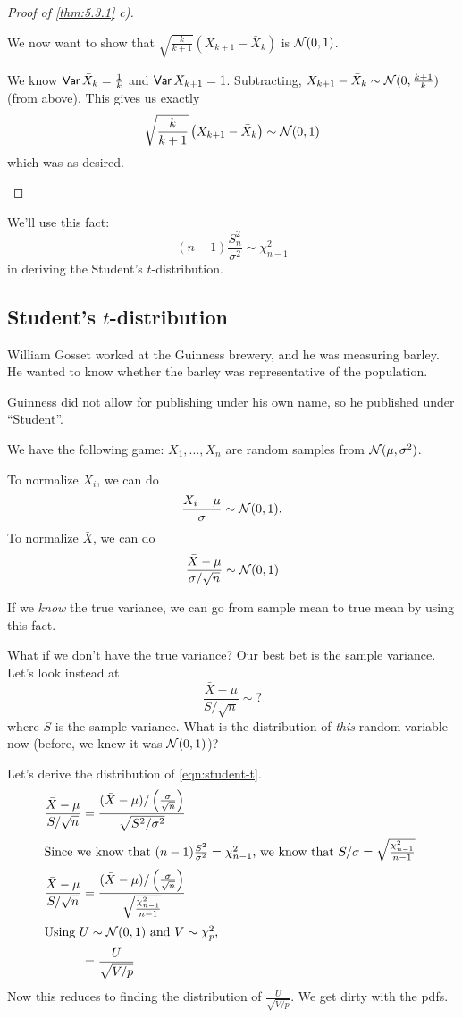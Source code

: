 \begin{proof}[Proof of \cref{thm:5.3.1} c)]
\begin{description}
            We now want to show that $\sqrt{\frac{k}{k+1}}(X_{k+1}-\bar{X}_k)$ is $\mathcal N(0, 1)$.

            We know $\operatorname{\mathsf{Var}} \bar{X}_k = \frac{1}{k}$ and $\operatorname{\mathsf{Var}} X_{k+1} = 1$. Subtracting, $X_{k+1} - \bar{X}_k \sim \mathcal N(0, \frac{k+1}{k})$ (from above). This gives us exactly
            \[\sqrt{\frac{k}{k+1}}\left( X_{k+1} - \bar{X}_k \right)\sim \mathcal N(0, 1)\]
            which was as desired.
    \end{description}
\end{proof}

We'll use this fact:
\[(n-1)\frac{S_n^2}{\sigma^2}\sim \chi^2_{n-1}\]
in deriving the Student's $t$-distribution.

\subsection{Student's \texorpdfstring{$t$}{t}-distribution}

\begin{remark*}
    William Gosset worked at the Guinness brewery, and he was measuring barley. He wanted to know whether the barley was representative of the population.

    Guinness did not allow for publishing under his own name, so he published under ``Student''.
\end{remark*}

We have the following game: $X_1, \dots, X_n$ are random samples from $\mathcal N(\mu, \sigma^2)$.

To normalize $X_i$, we can do
\[\frac{X_i - \mu}{\sigma}\sim \mathcal N(0, 1).\]
To normalize $\bar{X}$, we can do
\[\frac{\bar{X} - \mu}{\sigma/\sqrt{n}}\sim \mathcal N(0, 1)\]

If we \emph{know} the true variance, we can go from sample mean to true mean by using this fact.

What if we don't have the true variance? Our best bet is the sample variance. Let's look instead at
\begin{equation}\label{eqn:student-t}
    \frac{\bar{X} - \mu}{S/\sqrt{n}}\sim ?
\end{equation}
where $S$ is the sample variance. What is the distribution of \emph{this} random variable now (before, we knew it was $\mathcal N(0, 1)$)?

Let's derive the distribution of \cref{eqn:student-t}.
\begin{align*}
    \frac{\bar{X} - \mu}{S/\sqrt{n}} & = \frac{(\bar{X} - \mu)/\left(\frac{\sigma}{\sqrt{n}}\right)}{\sqrt{S^2/\sigma^2}}                \\
    \intertext{Since we know that $(n-1)\frac{S^2}{\sigma^2} = \chi_{n-1}^2$, we know that $S/\sigma = \sqrt{\frac{\chi^2_{n-1}}{n-1}}$
    }
    \frac{\bar{X} - \mu}{S/\sqrt{n}} & = \frac{(\bar{X} - \mu)/ \left(  \frac{\sigma}{\sqrt{n}}\right)}{\sqrt{\frac{\chi_{n-1}^2}{n-1}}} \\
    \intertext{Using $U \sim \mathcal N(0,1)$ and $V\sim \chi^2_p$, }
                                     & = \frac{U}{\sqrt{V/p}}
\end{align*}
Now this reduces to finding the distribution of $\frac{U}{\sqrt{V/p}}$. We get dirty with the pdfs.

